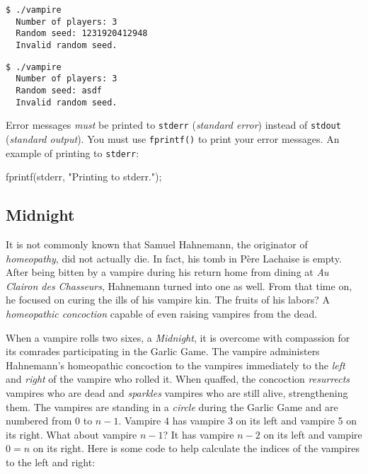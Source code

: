 \documentclass[11pt]{article}
\begin{document}
\begin{lstlisting}[style=bashstyle]
  $ ./vampire
  Number of players: 3
  Random seed: 1231920412948
  Invalid random seed.
\end{lstlisting}

\begin{lstlisting}[style=bashstyle]
  $ ./vampire
  Number of players: 3
  Random seed: asdf
  Invalid random seed.
\end{lstlisting}

Error messages \emph{must} be printed to \texttt{stderr} (\emph{standard error})
instead of \texttt{stdout} (\emph{standard output}). You must use
\texttt{fprintf()} to print your error messages. An example of printing to
\texttt{stderr}:

\begin{codelisting}{}
fprintf(stderr, "Printing to stderr.\n");
\end{codelisting}


\subsection{Midnight}


It is not commonly known that Samuel Hahnemann, the originator of
\emph{homeopathy}, did not actually die. In fact, his tomb in P\`ere Lachaise is
empty. After being bitten by a vampire during his return home from dining at \emph{Au
Clairon des Chasseurs}, Hahnemann turned into one as well. From that time on, he
focused on curing the ills of his vampire kin. The fruits of his labors? A
\emph{homeopathic concoction} capable of even raising vampires from the dead.

When a vampire rolls two sixes, a \emph{Midnight}, it is overcome with
compassion for its comrades participating in the Garlic Game. The vampire
administers Hahnemann's homeopathic concoction to the vampires immediately to
the \emph{left} and \emph{right} of the vampire who rolled it. When quaffed, the
concoction \emph{resurrects} vampires who are dead and \emph{sparkles} vampires
who are still alive, strengthening them. The vampires are standing in a
\emph{circle} during the Garlic Game and are numbered from 0 to $n-1$. Vampire 4
has vampire 3 on its left and vampire 5 on its right. What about vampire $n-1$?
It has vampire $n-2$ on its left and vampire $0=n$ on its right. Here is some
code to help calculate the indices of the vampires to the left and right:
\end{document}
